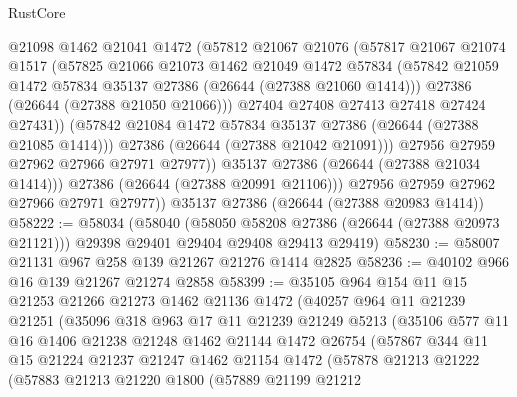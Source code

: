 \begin{lexlean}{RustCore}
\begin{coremodule}
                  @21098
                  @1462
                  @21041
                  @1472
                  (@57812
                    @21067
                    @21076
                    (@57817
                      @21067
                      @21074
                      @1517
                      (@57825
                        @21066
                        @21073
                        @1462
                        @21049
                        @1472
                        @57834
                        (@57842 @21059 @1472 @57834 @35137 @27386 (@26644 (@27388 @21060 @1414)))
                        @27386
                        (@26644 (@27388 @21050 @21066)))
                      @27404
                      @27408
                      @27413
                      @27418
                      @27424
                      @27431))
                  (@57842 @21084 @1472 @57834 @35137 @27386 (@26644 (@27388 @21085 @1414)))
                  @27386
                  (@26644 (@27388 @21042 @21091)))
                @27956
                @27959
                @27962
                @27966
                @27971
                @27977))
            @35137
            @27386
            (@26644 (@27388 @21034 @1414)))
          @27386
          (@26644 (@27388 @20991 @21106)))
        @27956
        @27959
        @27962
        @27966
        @27971
        @27977))
    @35137
    @27386
    (@26644 (@27388 @20983 @1414))
@58222 := @58034
    (@58040
      (@58050 @58208 @27386 (@26644 (@27388 @20973 @21121)))
      @29398
      @29401
      @29404
      @29408
      @29413
      @29419)
@58230 := @58007 @21131 @967 @258 @139 @21267 @21276 @1414 @2825
@58236 := @40102 @966 @16 @139 @21267 @21274 @2858
@58399 := @35105
    @964
    @154
    @11
    @15
    @21253
    @21266
    @21273
    @1462
    @21136
    @1472
    (@40257
      @964
      @11
      @21239
      @21251
      (@35096
        @318
        @963
        @17
        @11
        @21239
        @21249
        @5213
        (@35106
          @577
          @11
          @16
          @1406
          @21238
          @21248
          @1462
          @21144
          @1472
          @26754
          (@57867
            @344
            @11
            @15
            @21224
            @21237
            @21247
            @1462
            @21154
            @1472
            (@57878
              @21213
              @21222
              (@57883
                @21213
                @21220
                @1800
                (@57889
                  @21199
                  @21212

\end{coremodule}
\end{lexlean}
